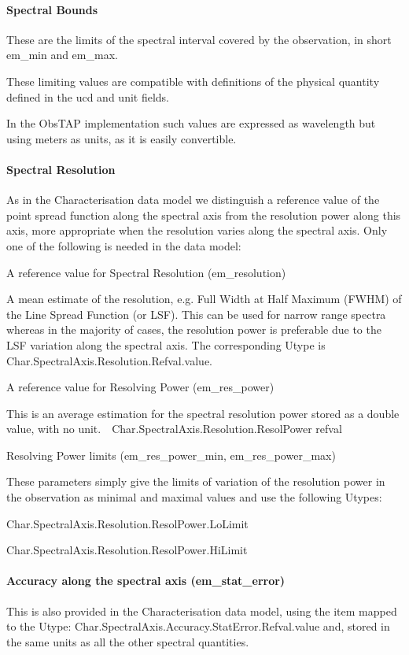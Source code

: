\documentclass[11pt,a4paper]{ivoa}
\begin{document}
\paragraph{Spectral Bounds}
\label{bkm:Ref419133828}These are the limits of the spectral interval covered by the observation, in short em\_min and
em\_max. 

These limiting values are compatible with definitions of the physical quantity defined in the ucd and unit fields.

In the ObsTAP implementation such values are expressed as wavelength but using meters as units, as it is easily
convertible.

\paragraph{Spectral Resolution}
As in the Characterisation data model we distinguish a reference value of the point spread function along the spectral
axis from the resolution power along this axis, more appropriate when the resolution varies along the spectral axis.
Only one of the following is needed in the data model:

A reference value for Spectral Resolution (em\_resolution)

A mean estimate of the resolution, e.g. Full Width at Half Maximum (FWHM) of the Line Spread Function (or LSF).  This
can be used for narrow range spectra whereas in the majority of cases, the resolution power is preferable due to the
LSF variation along the spectral axis. The corresponding Utype is Char.SpectralAxis.Resolution.Refval.value.

A reference value for Resolving Power (em\_res\_power)

This is an average estimation for the spectral resolution power stored as a double value, with no
unit.\ \ Char.SpectralAxis.Resolution.ResolPower refval

Resolving Power limits (em\_res\_power\_min, em\_res\_power\_max)

These parameters simply give the limits of variation of the resolution power in the observation as minimal and maximal
values and use the following Utypes: 

Char.SpectralAxis.Resolution.ResolPower.LoLimit

Char.SpectralAxis.Resolution.ResolPower.HiLimit

\paragraph{Accuracy along the spectral axis (em\_stat\_error)}
This is also provided in the Characterisation data model, using the item mapped to the Utype:
Char.SpectralAxis.Accuracy.StatError.Refval.value and, stored in the same units as all the other spectral quantities. 
\end{document}
